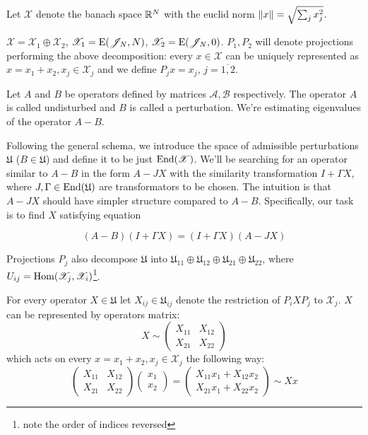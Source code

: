 \documentclass{article}
\begin{document}
Let $\mathscr X$ denote the banach space $\mathbb{R}^N$ with the euclid norm $\left\|{x}\right\| = \sqrt{\sum_j x_j^2}$.

$\mathscr X = \mathscr X_1 \oplus \mathscr X_2$,
$\mathscr X_1 = \mathrm{E}({\mathscr{J}_{N}}, {N})$,
$\mathscr X_2 = \mathrm{E}({\mathscr{J}_{N}}, {0})$.
$P_1, P_2$ will denote projections performing the above decomposition:
every $x\in\mathscr X$ can be uniquely represented as $x = x_1 + x_2, x_j\in\mathscr X_j$
and we define $P_j x = x_j$, $j=\overline{1,2}$.

Let $A$ and $B$ be operators defined by matrices $\mathcal A, \mathcal B$ respectively.
The operator $A$ is called undisturbed and $B$ is called a perturbation.
We're estimating eigenvalues of the operator $A - B$.

Following the general schema, we introduce
the space of admissible perturbations $\mathfrak U$ ($B\in\mathfrak U$)
and define it to be just $\mathrm{End}({\mathscr X})$.
We'll be searching for an operator similar to $A - B$
in the form $A - JX$ with the similarity transformation $I + \Gamma X$,
where $J, \Gamma \in \mathrm{End}({\mathfrak U})$ are transformators to be chosen.
The intuition is that $A - JX$ should have simpler structure compared to $A-B$.
Specifically, our task is to find $X$ satisfying equation

$$(A - B)(I + \Gamma X) = (I + \Gamma X)(A - JX)$$

Projections $P_j$ also decompose $\mathfrak U$ into
$\mathfrak U_{11} \oplus \mathfrak U_{12} \oplus \mathfrak U_{21} \oplus \mathfrak U_{22}$,
where $U_{ij} = \mathrm{Hom}({\mathscr X_j},{\mathscr X_i})$\footnote{note the order of indices reversed}.

For every operator $X\in\mathfrak U$
let $X_{ij} \in \mathfrak U_{ij}$ denote the restriction of $P_i X P_j$ to $\mathscr X_j$.
$X$ can be represented by operators matrix:
$$X \sim \begin{pmatrix}
    X_{11} & X_{12} \\
    X_{21} & X_{22}
\end{pmatrix}$$
which acts on every $x = x_1 + x_2, x_j\in\mathscr X_j$ the following way:
$$\begin{pmatrix}
    X_{11} & X_{12} \\
    X_{21} & X_{22}
\end{pmatrix}
\begin{pmatrix} x_1 \\ x_2 \end{pmatrix}
= \begin{pmatrix}
    X_{11} x_1 + X_{12} x_2 \\
    X_{21} x_1 + X_{22} x_2
\end{pmatrix}
\sim X x
$$
\end{document}
